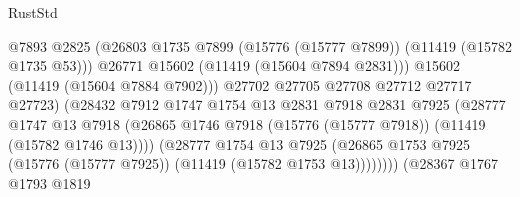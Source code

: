 \begin{lexlean}{RustStd}
\begin{coremodule}
                                              @7893
                                              @2825
                                              (@26803
                                                @1735
                                                @7899
                                                (@15776 (@15777 @7899))
                                                (@11419 (@15782 @1735 @53)))
                                              @26771
                                              @15602
                                              (@11419 (@15604 @7894 @2831)))
                                            @15602
                                            (@11419 (@15604 @7884 @7902)))
                                          @27702
                                          @27705
                                          @27708
                                          @27712
                                          @27717
                                          @27723)
                                        (@28432
                                          @7912
                                          @1747
                                          @1754
                                          @13
                                          @2831
                                          @7918
                                          @2831
                                          @7925
                                          (@28777
                                            @1747
                                            @13
                                            @7918
                                            (@26865
                                              @1746
                                              @7918
                                              (@15776 (@15777 @7918))
                                              (@11419 (@15782 @1746 @13))))
                                          (@28777
                                            @1754
                                            @13
                                            @7925
                                            (@26865
                                              @1753
                                              @7925
                                              (@15776 (@15777 @7925))
                                              (@11419 (@15782 @1753 @13))))))))
                                  (@28367
                                    @1767
                                    @1793
                                    @1819

\end{coremodule}
\end{lexlean}
